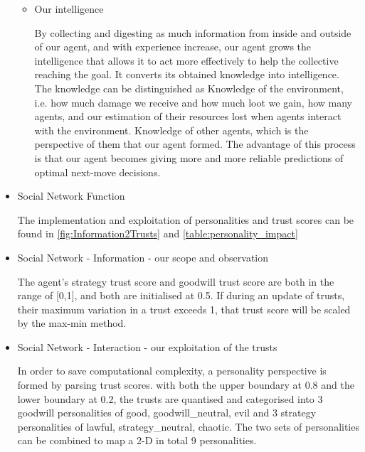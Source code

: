 \begin{itemize}
\begin{itemize}
\begin{itemize}
\begin{flushleft}
                    \end{flushleft}                
            \end{itemize}
        \item Our intelligence 
            \begin{flushleft}
            \setlength{\parindent}{2em}
            By collecting and digesting as much information from inside and outside of our agent, and with experience increase, our agent grows the intelligence that allows it to act more effectively to help the collective reaching the goal. It converts its obtained knowledge into intelligence. The knowledge can be distinguished as Knowledge of the environment, i.e. how much damage we receive and how much loot we gain, how many agents, and our estimation of their resources lost when agents interact with the environment. Knowledge of other agents, which is the perspective of them that our agent formed.  The advantage of this process is that our agent becomes giving more and more reliable predictions of optimal next-move decisions.

            \end{flushleft}        
    \end{itemize}

\item Social Network Function
            \begin{flushleft}
            \setlength{\parindent}{2em}
            The implementation and exploitation of personalities and trust scores can be found in \ref{fig:Information2Trusts} and \ref{table:personality_impact}
            \end{flushleft}

\item Social Network - Information - our scope and observation
            \begin{flushleft}
            \setlength{\parindent}{2em}

The agent's strategy trust score and goodwill trust score are both in the range of [0,1], and both are initialised at 0.5. If during an update of trusts, their maximum variation in a trust exceeds 1, that trust score will be scaled by the max-min method.
            \end{flushleft}
\item Social Network - Interaction - our exploitation of the trusts
        \begin{flushleft}
        \setlength{\parindent}{2em}
        In order to save computational complexity, a personality perspective is formed by parsing trust scores. with both the upper boundary at 0.8 and the lower boundary at 0.2, the trusts are quantised and categorised into 3 goodwill personalities of {good, goodwill\_neutral, evil} and 3 strategy personalities of {lawful, strategy\_neutral, chaotic}. The two sets of personalities can be combined to map a 2-D in total 9 personalities. 
        \end{flushleft}

\end{itemize}

